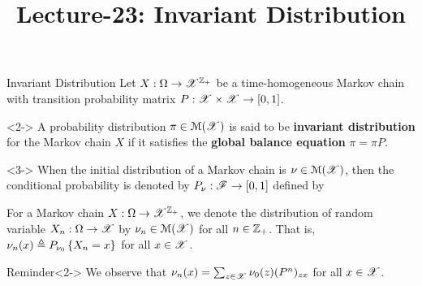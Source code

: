 \documentclass[12pt,aspectratio=169]{beamer}
\title{ Lecture-23: Invariant Distribution}
\date{}
\begin{document}
\pagestyle{empty}
\maketitle

\begin{frame}{Invariant Distribution} 
Let $X: \Omega \to \mathscr{X}^{\mathbb{Z}_+}$ be a time-homogeneous Markov chain with transition probability matrix $P: \mathscr{X}\times\mathscr{X}\to[0,1]$. 
\begin{Definition}<2->
A probability distribution $\pi \in \mathcal{M}(\mathscr{X})$ is said to be %
\textbf{invariant distribution} for the Markov chain $X$ if it satisfies the \textbf{global balance equation} $\pi = \pi P$. 
\end{Definition}
\begin{Definition}<3->
When the initial distribution of a Markov chain is $\nu \in \mathcal{M}(\mathscr{X})$, 
then the conditional probability is denoted by $P_\nu: \mathscr{F} \to [0,1]$ defined by 
\end{Definition}
\end{frame}

\begin{frame}
\begin{Definition} 
For a Markov chain $X:\Omega\to\mathscr{X}^{\mathbb{Z}_+}$, 
we denote the distribution of random variable $X_n:\Omega\to\mathscr{X}$ by $\nu_n \in \mathcal{M}(\mathscr{X})$ for all $n \in \mathbb{Z}_+$. 
That is, $\nu_n(x) \triangleq P_{\nu_0}\left\{X_n = x\right\}$ for all $x \in \mathscr{X}$. 
\end{Definition}
\begin{block}{Reminder}<2->
We observe that $\nu_n(x) = \sum_{z\in\mathscr{X}}\nu_0(z)(P^n)_{zx}$ for all $x \in \mathscr{X}$. 
\end{block}
\end{frame}
\end{document}

